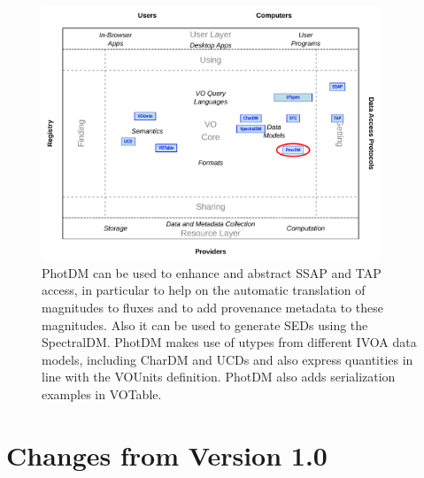 \documentclass[11pt,a4paper]{ivoa}
\begin{document}
\begin{figure}[H] 
\centering


\includegraphics[width=0.9\textwidth]{role_diagram.pdf}
\caption{PhotDM can be used to enhance and abstract SSAP and TAP access, in particular 
to help on the automatic translation of magnitudes to fluxes and to add provenance 
metadata to these magnitudes. Also it can be used to generate SEDs using the SpectralDM.
PhotDM makes use of utypes from different IVOA data models, including CharDM and UCDs and
also express quantities in line with the VOUnits definition.
PhotDM also adds serialization examples in VOTable.
}
\label{fig:archdiag}
\end{figure}

\section*{Changes from Version 1.0} \label{changesTable}

\end{document}
